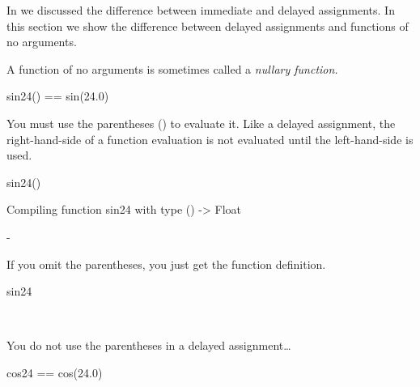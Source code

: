 In  we discussed the difference between immediate and
delayed assignments.
In this section we show the difference between delayed
assignments and functions of no arguments.

\begin{xtc}
\begin{xtccomment}
A function of no arguments is sometimes called a {\it nullary function.}
\end{xtccomment}
\begin{spadsrc}
sin24() == sin(24.0) 
\end{spadsrc}
\end{xtc}
\begin{xtc}
\begin{xtccomment}
You must use the parentheses (\spadSyntax{()}) to evaluate it.
Like a delayed assignment, the right-hand-side of a function evaluation
is not evaluated until the left-hand-side is used.
\end{xtccomment}
\begin{spadsrc}
sin24() 
\end{spadsrc}
\begin{MessageOutput}
   Compiling function sin24 with type () -> Float 
\end{MessageOutput}
\begin{TeXOutput}
\begin{fricasmath}{2}
-{}%
\end{fricasmath}
\end{TeXOutput}
\end{xtc}
\begin{xtc}
\begin{xtccomment}
If you omit the parentheses, you just get the function definition.
\end{xtccomment}
\begin{spadsrc}
sin24 
\end{spadsrc}
\begin{TeXOutput}
\begin{fricasmath}{3}
\ \PAREN{}\ \SYMBOL{==}\ %
\end{fricasmath}
\end{TeXOutput}
\end{xtc}
\begin{xtc}
\begin{xtccomment}
You do not use the parentheses \spadSyntax{()} in a delayed assignment\ldots
\end{xtccomment}
\begin{spadsrc}
cos24 == cos(24.0) 
\end{spadsrc}
\end{xtc}
